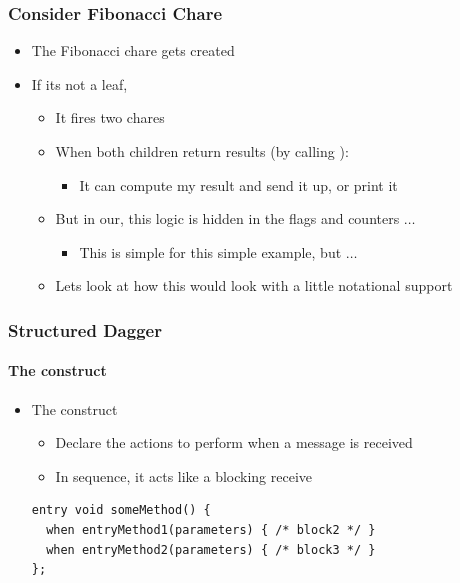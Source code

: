 \begin{frame}
  \frametitle{Consider Fibonacci Chare}
  \begin{itemize}
  \item The Fibonacci chare gets created
  \item If its not a leaf,
    \begin{itemize}
    \item It fires two chares
    \item When both children return results (by calling ):
      \begin{itemize}
      \item It can compute my result and send it up, or print it
      \end{itemize}
    \item But in our, this logic is hidden in the flags and counters $\ldots$
      \begin{itemize}
      \item This is simple for this simple example, but $\ldots$
      \end{itemize}
    \item Lets look at how this would look with a little notational support
    \end{itemize}
  \end{itemize}
\end{frame}


\begin{frame}[fragile]
  \frametitle{Structured Dagger}
  \framesubtitle{The  construct}
  \begin{itemize}
    \item The  construct
      \begin{itemize}
        \item Declare the actions to perform when a message is received
        \item In sequence, it acts like a blocking receive
      \end{itemize}
      \begin{lstlisting}[basicstyle=\normalsize]
entry void someMethod() {
  when entryMethod1(parameters) { /* block2 */ }
  when entryMethod2(parameters) { /* block3 */ }
};
      \end{lstlisting}
    \end{itemize}
\end{frame}

